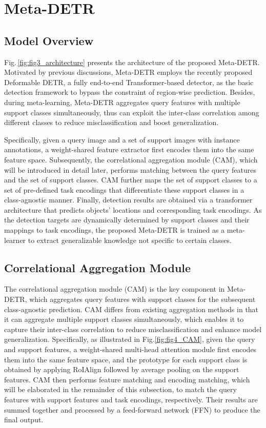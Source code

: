 \documentclass[letterpaper]{article} \usepackage{aaai22}  \usepackage{times}  \usepackage{helvet}  \usepackage{courier}  \usepackage[hyphens]{url}  \usepackage{graphicx} \urlstyle{rm} \def\UrlFont{\rm}  \usepackage{natbib}  \usepackage{caption} \DeclareCaptionStyle{ruled}{labelfont=normalfont,labelsep=colon,strut=off} \frenchspacing  \setlength{\pdfpagewidth}{8.5in}  \setlength{\pdfpageheight}{11in}  \usepackage{algorithm}
\begin{document}
\section{Meta-DETR}   \label{sec:meta-detr}



\subsection{Model Overview}

Fig.\,\ref{fig:fig3_architecture} presents the architecture of the proposed Meta-DETR. Motivated by previous discussions, Meta-DETR employs the recently proposed Deformable DETR\;\cite{DeformableDETR}, a fully end-to-end Transformer-based\;\cite{transformer} detector, as the basic detection framework to bypass the constraint of region-wise prediction. Besides, during meta-learning, Meta-DETR aggregates query features with multiple support classes simultaneously, thus can exploit the inter-class correlation among different classes to reduce misclassification and boost generalization.

Specifically, given a query image and a set of support images with instance annotations, a weight-shared feature extractor first encodes them into the same feature space. Subsequently, the correlational aggregation module (CAM), which will be introduced in detail later, performs matching between the query features and the set of support classes. CAM further maps the set of support classes to a set of pre-defined task encodings that differentiate these support classes in a class-agnostic manner. Finally, detection results are obtained via a transformer architecture that predicts objects' locations and corresponding task encodings. As the detection targets are dynamically determined by support classes and their mappings to task encodings, the proposed Meta-DETR is trained as a meta-learner to extract generalizable knowledge not specific to certain classes.


\subsection{Correlational Aggregation Module}

The correlational aggregation module (CAM) is the key component in Meta-DETR, which aggregates query features with support classes for the subsequent class-agnostic prediction.
CAM differs from existing aggregation methods in that it can aggregate multiple support classes simultaneously, which enables it to capture their inter-class correlation to reduce misclassification and enhance model generalization. Specifically, as illustrated in Fig.\;\ref{fig:fig4_CAM}, given the query and support features, a weight-shared multi-head attention module first encodes them into the same feature space, and the prototype for each support class is obtained by applying RoIAlign\;\cite{MaskRCNN} followed by average pooling on the support features. CAM then performs feature matching and encoding matching, which will be elaborated in the remainder of this subsection, to match the query features with support features and task encodings, respectively. Their results are summed together and processed by a feed-forward network (FFN) to produce the final output.
\end{document}
